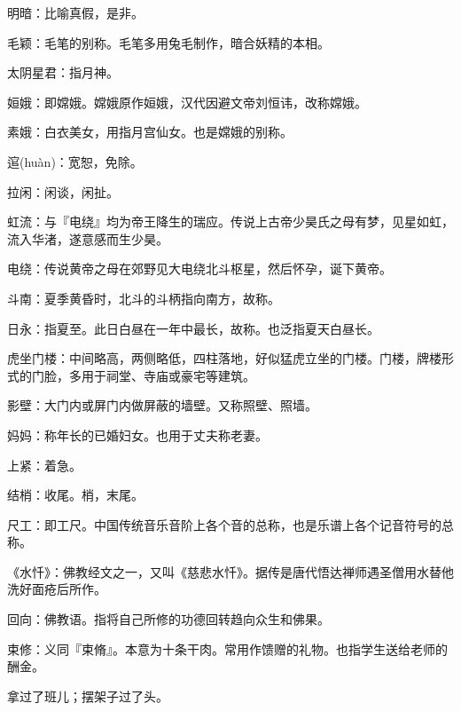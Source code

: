 \startbuffer[2418]
明暗：比喻真假，是非。
\stopbuffer


\startbuffer[2419]
毛颖：毛笔的别称。毛笔多用兔毛制作，暗合妖精的本相。
\stopbuffer


\startbuffer[2420]
太阴星君：指月神。
\stopbuffer


\startbuffer[2421]
姮娥：即嫦娥。嫦娥原作姮娥，汉代因避文帝刘恒讳，改称嫦娥。
\stopbuffer


\startbuffer[2422]
素娥：白衣美女，用指月宫仙女。也是嫦娥的别称。
\stopbuffer


\startbuffer[2423]
逭(huàn)：宽恕，免除。
\stopbuffer


\startbuffer[2424]
拉闲：闲谈，闲扯。
\stopbuffer


\startbuffer[2425]
虹流：与『电绕』均为帝王降生的瑞应。传说上古帝少昊氏之母有梦，见星如虹，流入华渚，遂意感而生少昊。
\stopbuffer


\startbuffer[2426]
电绕：传说黄帝之母在郊野见大电绕北斗枢星，然后怀孕，诞下黄帝。
\stopbuffer


\startbuffer[2427]
斗南：夏季黄昏时，北斗的斗柄指向南方，故称。
\stopbuffer


\startbuffer[2428]
日永：指夏至。此日白昼在一年中最长，故称。也泛指夏天白昼长。
\stopbuffer


\startbuffer[2429]
虎坐门楼：中间略高，两侧略低，四柱落地，好似猛虎立坐的门楼。门楼，牌楼形式的门脸，多用于祠堂、寺庙或豪宅等建筑。
\stopbuffer


\startbuffer[2430]
影壁：大门内或屏门内做屏蔽的墙壁。又称照壁、照墙。
\stopbuffer


\startbuffer[2431]
妈妈：称年长的已婚妇女。也用于丈夫称老妻。
\stopbuffer


\startbuffer[2432]
上紧：着急。
\stopbuffer


\startbuffer[2433]
结梢：收尾。梢，末尾。
\stopbuffer


\startbuffer[2434]
尺工：即工尺。中国传统音乐音阶上各个音的总称，也是乐谱上各个记音符号的总称。
\stopbuffer


\startbuffer[2435]
《水忏》：佛教经文之一，又叫《慈悲水忏》。据传是唐代悟达禅师遇圣僧用水替他洗好面疮后所作。
\stopbuffer


\startbuffer[2436]
回向：佛教语。指将自己所修的功德回转趋向众生和佛果。
\stopbuffer


\startbuffer[2437]
束修：义同『束脩』。本意为十条干肉。常用作馈赠的礼物。也指学生送给老师的酬金。
\stopbuffer


\startbuffer[2438]
拿过了班儿；摆架子过了头。
\stopbuffer


